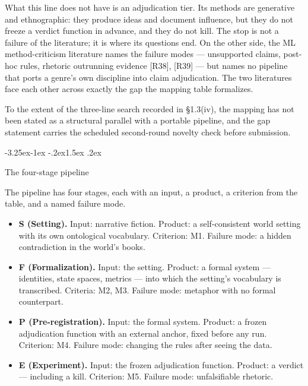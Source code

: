 \documentclass[11pt,a4paper]{article}
\makeatletter
\renewcommand\subsection{\@startsection{subsection}{2}{\z@}%
  {-3.25ex\@plus -1ex \@minus -.2ex}{1.5ex \@plus .2ex}%
  {\normalfont\large\bfseries\raggedright}}
\makeatother
\begin{document}
What this line does not have is an adjudication tier. Its methods are generative and ethnographic: they produce ideas and document influence, but they do not freeze a verdict function in advance, and they do not kill. The stop is not a failure of the literature; it is where its questions end. On the other side, the ML method-criticism literature names the failure modes — unsupported claims, post-hoc rules, rhetoric outrunning evidence [R38], [R39] — but names no pipeline that ports a genre's own discipline into claim adjudication. The two literatures face each other across exactly the gap the mapping table formalizes.

To the extent of the three-line search recorded in §1.3(iv), the mapping has not been stated as a structural parallel with a portable pipeline, and the gap statement carries the scheduled second-round novelty check before submission.

\subsection{The four-stage pipeline}

The pipeline has four stages, each with an input, a product, a criterion from the table, and a named failure mode.

\begin{itemize}[leftmargin=1.6em,itemsep=2pt,parsep=0pt,topsep=3pt]
\item \textbf{S (Setting).} Input: narrative fiction. Product: a self-consistent world setting with its own ontological vocabulary. Criterion: M1. Failure mode: a hidden contradiction in the world's books.
\item \textbf{F (Formalization).} Input: the setting. Product: a formal system — identities, state spaces, metrics — into which the setting's vocabulary is transcribed. Criteria: M2, M3. Failure mode: metaphor with no formal counterpart.
\item \textbf{P (Pre-registration).} Input: the formal system. Product: a frozen adjudication function with an external anchor, fixed before any run. Criterion: M4. Failure mode: changing the rules after seeing the data.
\item \textbf{E (Experiment).} Input: the frozen adjudication function. Product: a verdict — including a kill. Criterion: M5. Failure mode: unfalsifiable rhetoric.
\end{itemize}
\end{document}
